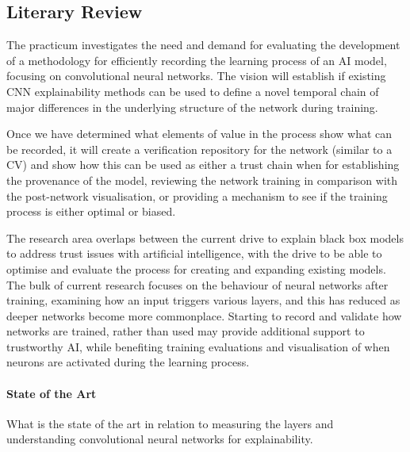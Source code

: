 \subsection{Literary Review}

The practicum investigates the need and demand for evaluating the development of a methodology for efficiently recording the learning process of an AI model, focusing on convolutional neural networks. The vision will establish if existing CNN explainability methods can be used to define a novel temporal chain of major differences in the underlying structure of the network during training.
 
Once we have determined what elements of value in the process show what can be recorded, it will create a verification repository for the network (similar to a CV) and show how this can be used as either a trust chain when for establishing the provenance of the model, reviewing the network training in comparison with the post-network visualisation, or providing a mechanism to see if the training process is either optimal or biased.

The research area overlaps between the current drive to explain black box models to address trust issues with artificial intelligence, with the drive to be able to optimise and evaluate the process for creating and expanding existing models. The bulk of current research focuses on the behaviour of neural networks after training, examining how an input triggers various layers, and this has reduced as deeper networks become more commonplace. Starting to record and validate how networks are trained, rather than used may provide additional support to trustworthy AI, while benefiting training evaluations and visualisation of when neurons are activated during the learning process.


\paragraph{State of the Art}
What is the state of the art in relation to measuring the layers and understanding convolutional neural networks for explainability.


